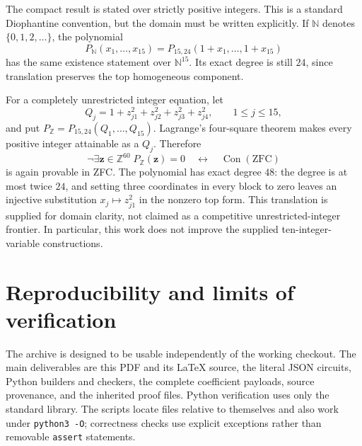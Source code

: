 \documentclass[11pt,a4paper]{article}
\theoremstyle{remark}
\newcommand{\Con}{\operatorname{Con}}
\newcommand{\ZFC}{\mathrm{ZFC}}
\newcommand{\Ptwo}{P_{15,24}}
\begin{document}
The compact result is stated over strictly positive integers. This is a
standard Diophantine convention, but the domain must be written explicitly.
If $\mathbb N$ denotes $\{0,1,2,\ldots\}$, the polynomial
\[
 P_{\mathbb N}(x_1,\ldots,x_{15})
       =\Ptwo(1+x_1,\ldots,1+x_{15})
\]
has the same existence statement over $\mathbb N^{15}$. Its exact degree
is still $24$, since translation preserves the top homogeneous component.

For a completely unrestricted integer equation, let
\[
 Q_j=1+z_{j1}^2+z_{j2}^2+z_{j3}^2+z_{j4}^2,
 \qquad 1\le j\le15,
\]
and put $P_{\mathbb Z}=\Ptwo(Q_1,\ldots,Q_{15})$. Lagrange's four-square
theorem makes every positive integer attainable as a $Q_j$. Therefore
\[
 \neg\exists\mathbf z\in\mathbb Z^{60}\;P_{\mathbb Z}(\mathbf z)=0
 \quad\longleftrightarrow\quad\Con(\ZFC)
\]
is again provable in ZFC. The polynomial has exact degree $48$: the degree
is at most twice $24$, and setting three coordinates in every block to
zero leaves an injective substitution $x_j\mapsto z_{j1}^2$ in the nonzero
top form. This translation is supplied for domain clarity, not claimed as
a competitive unrestricted-integer frontier. In particular, this work
does not improve the supplied ten-integer-variable constructions.

\section{Reproducibility and limits of verification}
\label{sec:checks}

The archive is designed to be usable independently of the working checkout.
The main deliverables are this PDF and its LaTeX source, the literal JSON
circuits, Python builders and checkers, the complete coefficient payloads,
source provenance, and the inherited proof files. Python verification uses
only the standard library. The scripts locate files relative to themselves
and also work under \texttt{python3 -O}; correctness checks use explicit
exceptions rather than removable \texttt{assert} statements.
\end{document}
